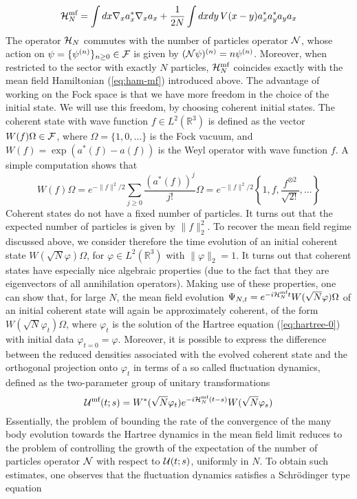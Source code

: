 \documentclass[11pt,a4paper,DIV11]{scrartcl}	%
\newcommand{\cU}{{\cal U}}
\newcommand{\bR}{{\mathbb R}}
\newcommand{\cF}{{\cal F}}
\newcommand{\cH}{{\cal H}}
\newcommand{\cN}{{\cal N}}
\begin{document}
\[ \cH^{\text{mf}}_N = \int dx \nabla_x a_x^* \nabla_x a_x + \frac{1}{2N} \int dxdy \, V(x-y) a_x^* a_y^*a_y a_x \]
The operator $\cH_N$ commutes with the number of particles operator $\cN$, whose action on $\psi = \{ \psi^{(n)} \}_{n\geq 0} \in \cF$ is given by $(\cN \psi)^{(n)} = n \psi^{(n)}$. Moreover, when restricted to the sector with exactly $N$ particles, $\cH^{\text{mf}}_N$ coincides exactly with the mean field Hamiltonian (\ref{eq:ham-mf}) introduced above. The advantage of working on the Fock space is that we have more freedom in the choice of the initial state. We will use this freedom, by choosing coherent initial states. The coherent state with wave function $f \in L^2 (\bR^3)$ is defined as the vector $W(f) \Omega \in \cF$, where $\Omega = \{ 1, 0, \dots \}$ is the Fock vacuum, and $W(f)= \exp (a^* (f) - a(f))$ is the Weyl operator with wave function $f$.  A simple computation shows that
\[ W(f) \Omega = e^{-\| f \|^2/2} \sum_{j \geq 0} \frac{(a^* (f))^j}{j!} \Omega = e^{-\|f \|^2/2} \left\{ 1, f , \frac{f^{\otimes 2}}{\sqrt{2!}} , \dots \right\} \]
Coherent states do not have a fixed number of particles. It turns out that the expected number of particles is given by $\| f \|_2^2$. To recover the mean field regime discussed above, we consider therefore the time evolution of an initial coherent state $W(\sqrt{N} \varphi) \Omega$, for $\varphi \in L^2 (\bR^3)$ with $\| \varphi \|_2 = 1$. It turns out that coherent states have especially nice algebraic properties (due to the fact that they are eigenvectors of all annihilation operators). Making use of these properties, one can show that, for large $N$, the mean field evolution $\Psi_{N,t} = e^{-i\cH^{\text{mf}}_N t} W(\sqrt{N} \varphi) \Omega$ of an initial coherent state will again be approximately coherent, of the form $W(\sqrt{N} \varphi_t) \Omega$, where $\varphi_t$ is the solution of the Hartree equation (\ref{eq:hartree-0}) with initial data $\varphi_{t=0} = \varphi$. Moreover, it is possible to express the difference between the reduced densities associated with the evolved coherent state and the orthogonal projection onto $\varphi_t$ in terms of a so called fluctuation dynamics, defined as the two-parameter group of unitary transformations
\begin{equation}\label{eq:cU-mf} \cU^{\text{mf}} (t;s) = W^* (\sqrt{N} \varphi_t) e^{-i \cH^{\text{mf}}_N (t-s)} W(\sqrt{N} \varphi_s) \end{equation}
Essentially, the problem of bounding the rate of the convergence of the many body evolution towards the Hartree dynamics in the mean field limit reduces to the problem of controlling the growth of the expectation of the number of particles operator $\cN$ with respect to $\cU (t;s)$, uniformly in $N$. To obtain such estimates, one observes that the fluctuation dynamics satisfies a Schr\"odinger type equation
\end{document}
